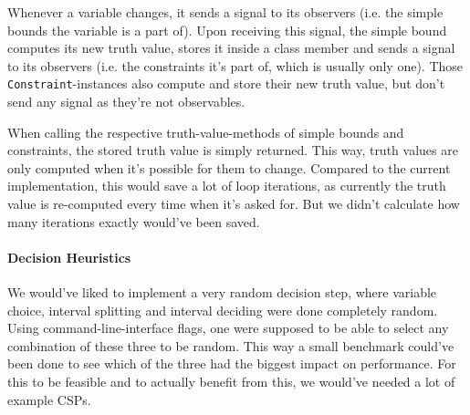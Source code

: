Whenever a variable changes, it sends a signal to its observers (i.e. the simple bounds the variable is a part of).
Upon receiving this signal, the simple bound computes its new truth value, stores it inside a class member and sends a signal to its observers (i.e. the constraints it's part of, which is usually only one).
Those \texttt{Constraint}-instances also compute and store their new truth value, but don't send any signal as they're not observables.

When calling the respective truth-value-methods of simple bounds and constraints, the stored truth value is simply returned.
This way, truth values are only computed when it's possible for them to change.
Compared to the current implementation, this would save a lot of loop iterations, as currently the truth value is re-computed every time when it's asked for.
But we didn't calculate how many iterations exactly would've been saved.


\paragraph{Decision Heuristics}
We would've liked to implement a very random decision step, where variable choice, interval splitting and interval deciding were done completely random.
Using command-line-interface flags, one were supposed to be able to select any combination of these three to be random.
This way a small benchmark could've been done to see which of the three had the biggest impact on performance.
For this to be feasible and to actually benefit from this, we would've needed a lot of example CSPs.
